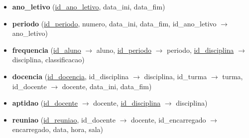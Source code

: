\documentclass[12pt,a4paper,reqno]{report}
\numberwithin{figure}{section}
\numberwithin{equation}{section}
\begin{document}
\begin{itemize}
\item \textbf{ano\_letivo} (\underline{id\_ano\_letivo}, data\_ini, data\_fim)

\item \textbf{periodo} (\underline{id\_periodo}, numero, data\_ini, data\_fim, id\_ano\_letivo $\rightarrow$ ano\_letivo)

\item \textbf{frequencia} (\underline{id\_aluno} $\rightarrow$ aluno, \underline{id\_periodo} $\rightarrow$ periodo, \underline{id\_disciplina} $\rightarrow$ disciplina, classificacao)

\item \textbf{docencia} (\underline{id\_docencia}, id\_disciplina $\rightarrow$ disciplina, id\_turma $\rightarrow$ turma, id\_docente $\rightarrow$ docente, data\_ini, data\_fim)

\item \textbf{aptidao} (\underline{id\_docente} $\rightarrow$ docente, \underline{id\_disciplina} $\rightarrow$ disciplina)

\item \textbf{reuniao} (\underline{id\_reuniao}, id\_docente $\rightarrow$ docente, id\_encarregado $\rightarrow$ encarregado, data, hora, sala)

\end{itemize}
\end{document}
